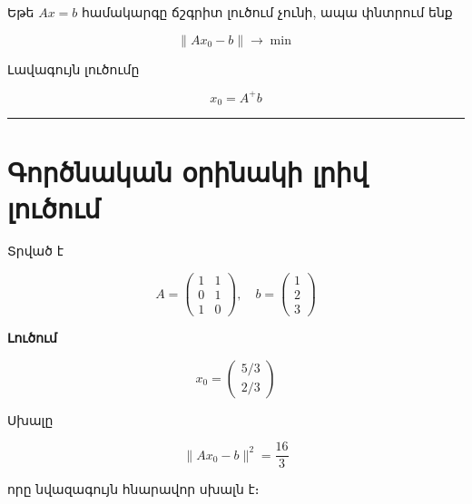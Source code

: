 \documentclass[12pt, a4paper]{article}
\begin{document}
Եթե \(Ax=b\) համակարգը ճշգրիտ լուծում չունի, ապա փնտրում ենք

$$
\|Ax_0 - b\| \to \min
$$

Լավագույն լուծումը

$$
x_0 = A^+ b
$$

\vspace{1em}
\hrule
\vspace{1em}

\section{Գործնական օրինակի լրիվ լուծում}

Տրված է

$$
A =
\begin{pmatrix}
1 & 1 \\
0 & 1 \\
1 & 0
\end{pmatrix},
\quad
b =
\begin{pmatrix}
1 \\
2 \\
3
\end{pmatrix}
$$

\textbf{Լուծում}

$$
x_0 =
\begin{pmatrix}
5/3 \\
2/3
\end{pmatrix}
$$

Սխալը

$$
\|Ax_0 - b\|^2 = \frac{16}{3}
$$

որը նվազագույն հնարավոր սխալն է։
\end{document}
